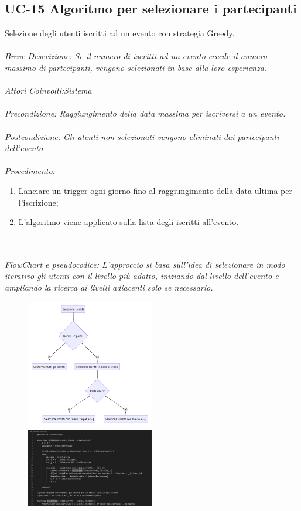 \subsection{UC-15 Algoritmo per selezionare i partecipanti}
Selezione degli utenti iscritti ad un evento con strategia Greedy.
\\
\\
\textit{Breve Descrizione: Se il numero di iscritti ad un evento eccede il numero massimo di partecipanti, vengono selezionati in base alla loro esperienza.} 
\\
\\
\textit{Attori Coinvolti:Sistema}
\\
\\
\textit{Precondizione: Raggiungimento della data massima per iscriversi a un evento.}
\\
\\
\textit{Postcondizione: Gli utenti non selezionati vengono eliminati dai partecipanti dell'evento}
\\
\\
\textit{Procedimento:}
\begin{enumerate}
	\item Lanciare un trigger ogni giorno fino al raggiungimento della data ultima per l'iscrizione;
	\item L'algoritmo viene applicato sulla lista degli iscritti all'evento.
\end{enumerate}
\\
\\
\textit{FlowChart e pseudocodice: L'approccio si basa sull'idea di selezionare in modo iterativo gli utenti con il livello più
adatto, iniziando dal livello dell'evento e ampliando la ricerca ai livelli adiacenti solo se
necessario.}
\\
\begin{figure}[htb]
    \centering
    \includegraphics[width = 0.5\textwidth]{images/flowchart.png}
    \includegraphics[width = 0.5\textwidth]{images/pseudocodice.png}
\end{figure}
